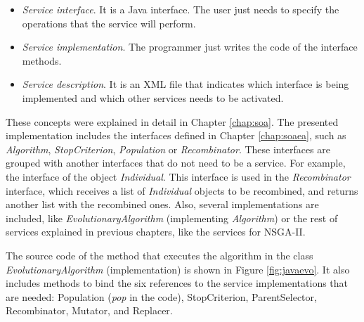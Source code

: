 \begin{itemize}
\item {\em Service interface}. It is a Java interface. The user just needs to specify the operations that the service will perform.
\item {\em Service implementation}. The programmer just writes the code of the interface methods.
\item {\em Service description}. It is an XML file that indicates which
  interface is being implemented and which other services needs to be
  activated. 
\end{itemize}
These concepts were explained in detail in Chapter \ref{chap:soa}.
The presented implementation includes the interfaces defined in Chapter \ref{chap:soaea}, such as {\em Algorithm}, {\em StopCriterion}, {\em Population} or {\em Recombinator}. These interfaces are grouped with another interfaces that do not need to be a service. For example, the interface of the object {\em Individual}. This interface is used in the {\em Recombinator} interface, which receives a list of {\em Individual} objects to be recombined, and returns another list with the recombined ones.
Also, several implementations are included, like {\em EvolutionaryAlgorithm} (implementing {\em  Algorithm}) or the rest of  services explained in previous chapters, like the services for NSGA-II.


The source code of the method that executes the algorithm in the class {\em EvolutionaryAlgorithm} (implementation) is shown in Figure \ref{fig:javaevo}. It also includes methods to bind the six references to the service implementations that are needed: Population ({\em pop} in the code), StopCriterion, ParentSelector, Recombinator, Mutator, and Replacer. 


